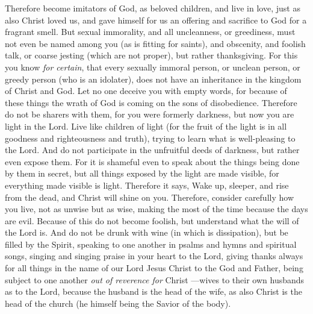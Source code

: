 \begin{biblechapter} %
 Therefore become imitators of God, as beloved children,
\verse and live in love, just as also Christ loved us, and gave himself for us an offering and sacrifice to God for a fragrant smell.
\verse But sexual immorality, and all uncleanness, or greediness, must not even be named among you (as is fitting for saints),
\verse and obscenity, and foolish talk, or coarse jesting (which are not proper), but rather thanksgiving.
\verse For this you know \textit{for certain}, that every sexually immoral person, or unclean person, or greedy person (who is an idolater), does not have an inheritance in the kingdom of Christ and God.
\verse Let no one deceive you with empty words, for because of these things the wrath of God is coming on the sons of disobedience.
 Therefore do not be sharers with them,
\verse for you were formerly darkness, but now you are light in the Lord. Live like children of light
\verse (for the fruit of the light is in all goodness and righteousness and truth),
\verse trying to learn what is well-pleasing to the Lord.
\verse And do not participate in the unfruitful deeds of darkness, but rather even expose them.
\verse For it is shameful even to speak about the things being done by them in secret,
\verse but all things exposed by the light are made visible,
\verse for everything made visible is light. Therefore it says, Wake up, sleeper, 
and rise from the dead, 
and Christ will shine on you.
\verse Therefore, consider carefully how you live, not as unwise but as wise,
\verse making the most of the time because the days are evil.
 Because of this do not become foolish, but understand what the will of the Lord is.
\verse And do not be drunk with wine (in which is dissipation), but be filled by the Spirit,
\verse speaking to one another in psalms and hymns and spiritual songs, singing and singing praise in your heart to the Lord,
\verse giving thanks always for all things in the name of our Lord Jesus Christ to the God and Father,
\verse being subject to one another \textit{out of reverence for} Christ
\verse —wives to their own husbands as to the Lord,
\verse because the husband is the head of the wife, as also Christ is the head of the church (he himself being the Savior of the body).

\end{biblechapter}
